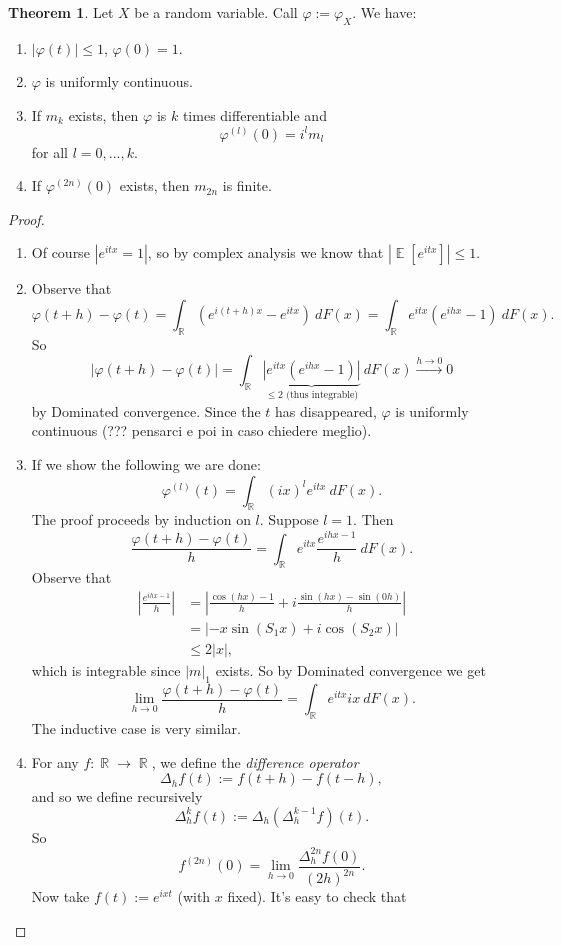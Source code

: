 \documentclass[12pt,a4paper]{report}
\theoremstyle{definition}
\newtheorem{theorem}{Theorem}[chapter] %
\theoremstyle{num.custom-title}
\DeclareMathOperator{\E}{\mathbb{E}}
\DeclareMathOperator{\R}{\mathbb{R}}
\renewcommand{\phi}{\varphi}
\renewcommand{\1}{\mathbbm{1}}
\begin{document}
\begin{theorem}
Let $X$ be a random variable. Call $\phi := \phi_X$. We have:
\begin{enumerate}
\item $|\phi(t)| \leq 1$, $\phi(0)=1$.
\item $\phi$ is uniformly continuous.
\item If $m_k$ exists, then $\phi$ is $k$ times differentiable and
\[
\phi^{(l)}(0) = i^l m_l
\]
for all $l=0,...,k$.
\item If $\phi^{(2n)}(0)$ exists, then $m_{2n}$ is finite.
\end{enumerate}
\begin{proof}\ 
\begin{enumerate}
\item Of course $|e^{itx}=1|$, so by complex analysis we know that $|\E[e^{itx}]| \leq 1$.
\item Observe that 
\[
\phi(t+h)-\phi(t) = \int_{\R} (e^{i(t+h)x} - e^{itx}) \ dF(x) = \int_{\R} e^{itx}(e^{ihx} - 1) \ dF(x).
\]
So
\[
|\phi(t+h)-\phi(t)| = \int_{\R} \underbrace{|e^{itx}(e^{ihx} - 1)|}_{\leq 2 \text{ (thus integrable)}} \ dF(x) \stackrel{h \to 0}{\longrightarrow} 0
\]
by Dominated convergence. Since the $t$ has disappeared, $\phi$ is uniformly continuous (??? pensarci e poi in caso chiedere meglio).
\item If we show the following we are done:
\[
\phi^{(l)}(t) = \int_{\R} (ix)^l e^{itx} \ dF(x).
\]
The proof proceeds by induction on $l$. Suppose $l=1$. Then
\[
\frac{\phi(t+h)-\phi(t)}{h} = \int_{\R} e^{itx} \frac{e^{ihx-1}}{h} \ dF(x).
\]
Observe that
\begin{align*}
\left| \frac{e^{ihx-1}}{h} \right|
&=\left| \frac{\cos(hx)-1}{h} + i\frac{\sin(hx)-\sin(0h)}{h} \right| \\
&= |-x \sin(S_1 x) + i \cos(S_2 x)| \tag{by Mean value theorem} \\
&\leq 2|x|,
\end{align*}
which is integrable since $|m|_1$ exists. So by Dominated convergence we get
\[
\lim_{h \to 0} \frac{\phi(t+h)-\phi(t)}{h} = \int_{\R} e^{itx} ix \ dF(x).
\]
The inductive case is very similar.
\item For any $f \colon \R \to \R$, we define the \emph{difference operator}
\[
\Delta_h f(t) := f(t+h)-f(t-h),
\]
and so we define recursively
\[
\Delta_h^k f(t) := \Delta_h (\Delta_h^{k-1} f)(t).
\]
So 
\[
f^{(2n)}(0) = \lim_{h \to 0} \frac{\Delta_h^{2n}f(0)}{(2h)^{2n}}.
\]
Now take $f(t) := e^{ixt}$ (with $x$ fixed).
It's easy to check that

\end{enumerate}
\end{proof}
\end{theorem}
\end{document}
